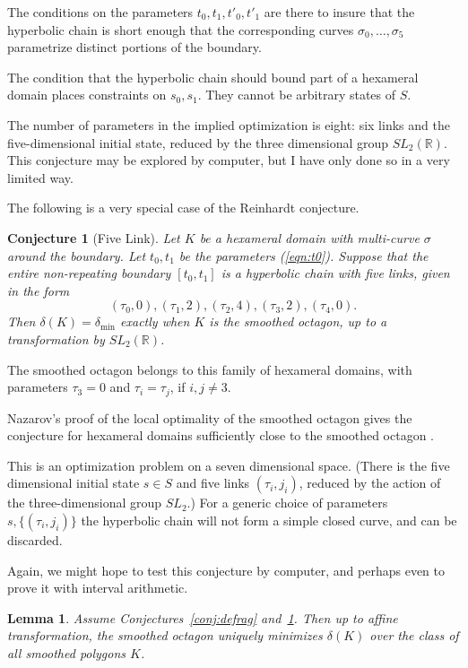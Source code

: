 \documentclass[11pt]{amsart}
\newtheorem{lemma}{Lemma}
\newtheorem{conj}{Conjecture}
\newcommand{\ring}[1]{\mathbb{#1}}
\def\deltalat{\mathbb\delta}  %
\def\delt{\delta_{\min}}
\def\rR{{\ring{R}}}
\def\ta{{\tau}}
\begin{document}
The conditions on the parameters $t_0,t_1,t'_0,t'_1$ are there
to insure that the hyperbolic chain is short enough that the corresponding curves $\sigma_0,\ldots,\sigma_5$ parametrize distinct portions
of the boundary.

The condition that the hyperbolic chain should bound part of a hexameral
domain places constraints on $s_0,s_1$.  They cannot be arbitrary
states of $S$.

The number of parameters in the implied optimization is eight:
six links and the five-dimensional initial state, reduced by the three dimensional group $SL_2(\rR)$.
This conjecture may be explored by computer, but I have only done
so in a very limited way.

\bigskip

The following is a very special case of the Reinhardt conjecture.

\begin{conj}[Five Link]\label{conj:5} 
Let $K$ be a hexameral domain with multi-curve $\sigma$ around the
boundary. 
Let $t_0,t_1$ be the parameters (\ref{eqn:t0}).  Suppose
that the entire non-repeating boundary $[t_0,t_1]$ is a hyperbolic chain with five
links, given in the form 
$$
(\ta_0,0),(\ta_1,2),(\ta_2,4),(\ta_3,2),(\ta_4,0).
$$
Then $\deltalat(K)= \delt$ exactly when
$K$ is the smoothed octagon, up to 
a transformation by $SL_2(\rR)$.
\end{conj}

The smoothed octagon belongs to this family of hexameral
domains, with parameters $\ta_3=0$ and $\ta_i=\ta_j$, if $i,j\ne 3$.

Nazarov's proof of the local optimality of the smoothed octagon
gives the conjecture for hexameral domains sufficiently close
to the smoothed octagon \cite{N}.

This is an optimization problem on a seven dimensional space.
(There is the five dimensional initial state $s\in S$ and
five links $(\ta_i,j_i)$, reduced by the action of the three-dimensional
group $SL_2$.)  For a generic choice of parameters $s,\{(\ta_i,j_i)\}$
the hyperbolic chain will not form a simple closed curve, and can
be discarded.  

Again, we might hope to test this conjecture by computer, and perhaps
even to prove it with interval arithmetic.

\begin{lemma}\label{lemma:smooth}  Assume Conjectures~\ref{conj:defrag} and~\ref{conj:5}.
Then up to affine transformation, the smoothed octagon uniquely
minimizes $\deltalat(K)$ over the class of all smoothed polygons $K$.
\end{lemma}
\end{document}
